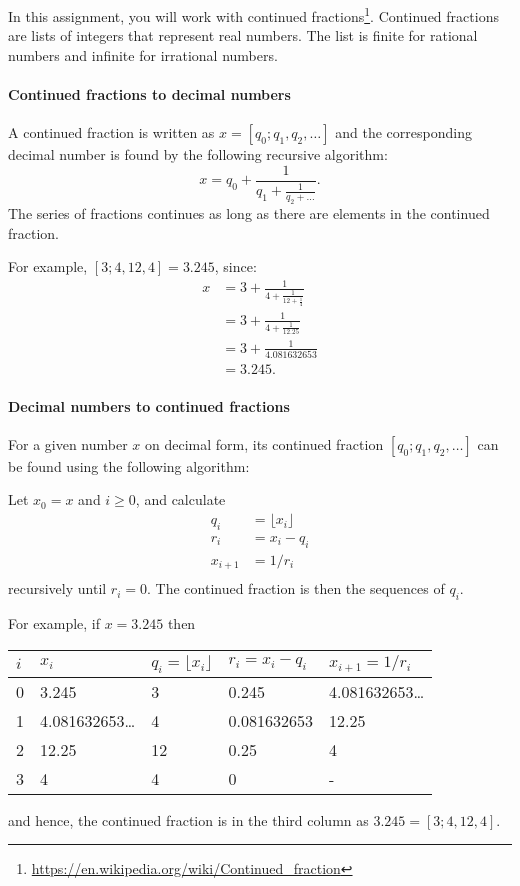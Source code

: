 In this assignment, you will work with continued
fractions\footnote{\url{https://en.wikipedia.org/wiki/Continued_fraction}}. Continued
fractions are lists of integers that represent real numbers. The list
is finite for rational numbers and infinite for irrational numbers.

\paragraph{Continued fractions to decimal numbers}
A continued fraction is written as $x = [q_0; q_1, q_2, \ldots]$ and the corresponding decimal number is found by the following recursive algorithm:
\begin{equation}
  x = q_0 + \frac{1}{q_1 + \frac{1}{q_2 + \dots}}.
\end{equation}
The series of fractions continues as long as there are elements in the continued fraction.

For example, $[3;4, 12, 4] = 3.245$, since:
\begin{align}
  x &= 3 + \frac{1}{4 + \frac{1}{12 + \frac{1}{4}}}
  \\&=  3 + \frac{1}{4 + \frac{1}{12.25}}
  \\&=  3 + \frac{1}{4.081632653}
  \\&=  3.245.
\end{align}

\paragraph{Decimal numbers to continued fractions}
For a given number $x$ on decimal form, its continued fraction $[q_0; q_1, q_2, \ldots]$ can be found using the following algorithm:

Let $x_0 = x$ and $i \geq 0$, and calculate
\begin{align}
q_i &= \lfloor x_i \rfloor\\
r_i &= x_i - q_i\\
x_{i+1} &= 1/r_i\\
\end{align}
recursively until $r_i = 0$. The continued fraction is then the sequences of $q_i$.

For example, if $x=3.245$ then
\begin{center}
  \begin{tabular}{|l|l|l|l|l|}
    \hline
    $i$ & $x_i$ & $q_i = \lfloor x_i \rfloor$ & $r_i = x_i - q_i$ & $x_{i+1}=1/r_i$\\
    \hline
    0 & 3.245 & 3 & 0.245 & 4.081632653\ldots\\
    1 & 4.081632653\ldots & 4 & 0.081632653 & 12.25\\
    2 & 12.25 & 12 & 0.25 & 4\\
    3 & 4 & 4 & 0 & -\\
    \hline
  \end{tabular}
\end{center}
and hence, the continued fraction is in the third column as $3.245 = [3; 4, 12, 4]$.

